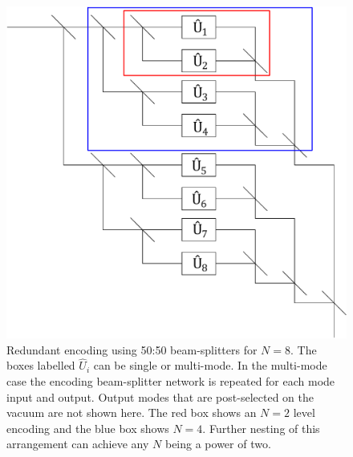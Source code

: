 \documentclass[aps,pra,twocolumn,superscriptaddress,numerical,floatfix]{revtex4-1}
\begin{document}
\begin{figure}[tbh]
	\includegraphics[width=\columnwidth]{unitaries.pdf}
	\caption{\label{fig:gen system}Redundant encoding using 50:50 beam-splitters for $N=8$. The boxes labelled $\hat{U}_i$ can be single or multi-mode.  In the multi-mode case the encoding beam-splitter network is repeated for each mode input and output. Output modes that are post-selected on the vacuum are not shown here. The red box shows an $N=2$ level encoding and the blue box shows $N=4$.  Further nesting of this arrangement can achieve any $N$ being a power of two.}
\end{figure}
	
	
\end{document}

